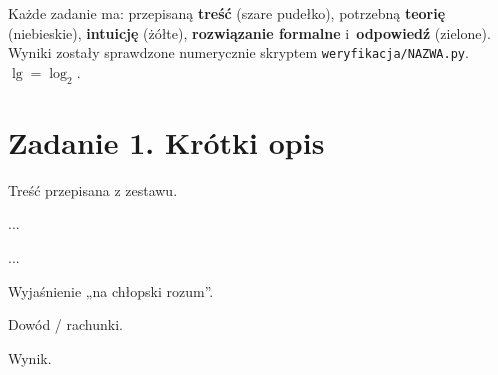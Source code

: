 \documentclass[11pt]{article}
\begin{document}

\begin{teoria}
Każde zadanie ma: przepisaną \textbf{treść} (szare pudełko), potrzebną
\textbf{teorię} (niebieskie), \textbf{intuicję} (żółte), \textbf{rozwiązanie
formalne} i~\textbf{odpowiedź} (zielone). Wyniki zostały sprawdzone
numerycznie skryptem \texttt{weryfikacja/NAZWA.py}. $\lg=\log_2$.
\end{teoria}

\section{Zadanie 1. Krótki opis}
\begin{tresc}
Treść przepisana z zestawu.
\end{tresc}

\begin{teoria}
\begin{definicja}...\end{definicja}
\begin{twierdzenie}...\end{twierdzenie}
\end{teoria}

\begin{intuicja}
Wyjaśnienie „na chłopski rozum”.
\end{intuicja}

\formalnie
Dowód / rachunki.

\begin{odpowiedz}
Wynik.
\end{odpowiedz}
\end{document}
